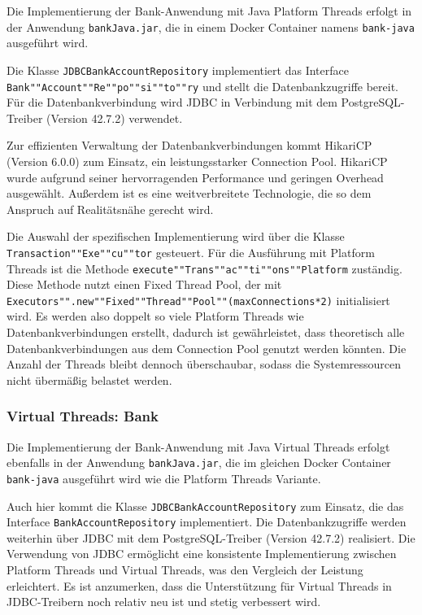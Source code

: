 \documentclass[fontsize=12pt,paper=a4,twoside=semi,parskip=half-,headsepline,headinclude]{scrreprt}
\begin{document}
Die Implementierung der Bank-Anwendung mit Java Platform Threads erfolgt in der Anwendung \texttt{bankJava.jar}, die in einem Docker Container namens \texttt{bank-java} ausgeführt wird.

Die Klasse \texttt{JDBCBankAccountRepository} implementiert das Interface \texttt{Bank""Account""Re""po""si""to""ry} und stellt die Datenbankzugriffe bereit. Für die Datenbankverbindung wird JDBC in Verbindung mit dem PostgreSQL-Treiber (Version 42.7.2) verwendet. 

Zur effizienten Verwaltung der Datenbankverbindungen kommt HikariCP (Version 6.0.0) zum Einsatz, ein leistungsstarker Connection Pool. HikariCP wurde aufgrund seiner hervorragenden Performance und geringen Overhead ausgewählt. Außerdem ist es eine weitverbreitete Technologie, die so dem Anspruch auf Realitätsnähe gerecht wird.

Die Auswahl der spezifischen Implementierung wird über die Klasse \texttt{Transaction""Exe""cu""tor} gesteuert. Für die Ausführung mit Platform Threads ist die Methode \texttt{execute""Trans""ac""ti""ons""Platform} zuständig. Diese Methode nutzt einen Fixed Thread Pool, der mit \texttt{Executors"".new""Fixed""Thread""Pool""(maxConnections*2)} initialisiert wird. Es werden also doppelt so viele Platform Threads wie Datenbankverbindungen erstellt, dadurch ist gewährleistet, dass theoretisch alle Datenbankverbindungen aus dem Connection Pool genutzt werden könnten. Die Anzahl der Threads bleibt dennoch überschaubar, sodass die Systemressourcen nicht übermäßig belastet werden.


\subsubsection{Virtual Threads: Bank}

Die Implementierung der Bank-Anwendung mit Java Virtual Threads erfolgt ebenfalls in der Anwendung \texttt{bankJava.jar}, die im gleichen Docker Container \texttt{bank-java} ausgeführt wird wie die Platform Threads Variante.

Auch hier kommt die Klasse \texttt{JDBCBankAccountRepository} zum Einsatz, die das Interface \texttt{BankAccountRepository} implementiert. Die Datenbankzugriffe werden weiterhin über JDBC mit dem PostgreSQL-Treiber (Version 42.7.2) realisiert. Die Verwendung von JDBC ermöglicht eine konsistente Implementierung zwischen Platform Threads und Virtual Threads, was den Vergleich der Leistung erleichtert. Es ist anzumerken, dass die Unterstützung für Virtual Threads in JDBC-Treibern noch relativ neu ist und stetig verbessert wird.
\end{document}
